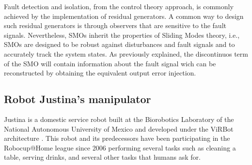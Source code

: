 \documentclass[a4paper, 10pt]{article}
\begin{document}
Fault detection and isolation, from the control theory approach, is commonly achieved by the implementation of residual generators. A common way to design such residual generators is through observers that are sensitive to the fault signals. Nevertheless, SMOs inherit the properties of Sliding Modes theory, i.e., SMOs are designed to be robust against disturbances and fault signals and to accurately track the system states. As previously explained, the discontinuos term of the SMO will contain information about the fault signal wich can be reconstructed by obtaining the equivalent output error injection. 

\subsection{Robot Justina's manipulator}
Justina is a domestic service robot built at the Biorobotics Laboratory of the National Autonomous University of Mexico and developed under the ViRBot architecture \cite{savage2008virbot}. This robot and its predecessors have been participating in the Robocup@Home league \cite{wachsmuth2015robocup} since 2006 performing several tasks such as cleaning a table, serving drinks, and several other tasks that humans ask for. 
\end{document}

